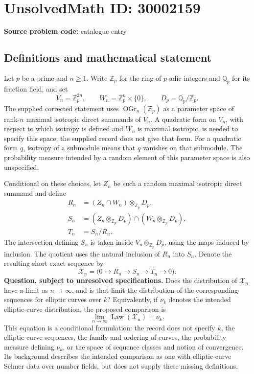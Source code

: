 \documentclass[11pt]{article}
\begin{document}
\section*{UnsolvedMath ID: 30002159}
\textbf{Source problem code:} catalogue entry
\subsection{Definitions and mathematical statement}
Let \(p\) be a prime and \(n\geq 1\). Write \(\mathbb Z_p\) for the ring of \(p\)-adic integers and \(\mathbb Q_p\) for its fraction field, and set
\[
V_n=\mathbb Z_p^{2n},\qquad W_n=\mathbb Z_p^n\times\{0\},\qquad D_p=\mathbb Q_p/\mathbb Z_p.
\]
The supplied corrected statement uses \(\operatorname{OGr}_n(\mathbb Z_p)\) as a parameter space of rank-\(n\) maximal isotropic direct summands of \(V_n\). A quadratic form on \(V_n\), with respect to which isotropy is defined and \(W_n\) is maximal isotropic, is needed to specify this space; the supplied record does not give that form. For a quadratic form \(q\), isotropy of a submodule means that \(q\) vanishes on that submodule. The probability measure intended by a random element of this parameter space is also unspecified.

Conditional on these choices, let \(Z_n\) be such a random maximal isotropic direct summand and define
\[
\begin{aligned}
R_n&=(Z_n\cap W_n)\otimes_{\mathbb Z_p}D_p,\\
S_n&=(Z_n\otimes_{\mathbb Z_p}D_p)\cap
       (W_n\otimes_{\mathbb Z_p}D_p),\\
T_n&=S_n/R_n.
\end{aligned}
\]
The intersection defining \(S_n\) is taken inside \(V_n\otimes_{\mathbb Z_p}D_p\), using the maps induced by inclusion. The quotient uses the natural inclusion of \(R_n\) into \(S_n\). Denote the resulting short exact sequence by
\[
\mathcal X_n=\bigl(0\longrightarrow R_n\longrightarrow S_n
\longrightarrow T_n\longrightarrow 0\bigr).
\]
\textbf{Question, subject to unresolved specifications.} Does the distribution of \(\mathcal X_n\) have a limit as \(n\to\infty\), and is that limit the distribution of the corresponding sequences for elliptic curves over \(k\)? Equivalently, if \(\nu_k\) denotes the intended elliptic-curve distribution, the proposed comparison is
\[
\lim_{n\to\infty}\operatorname{Law}(\mathcal X_n)=\nu_k.
\]
This equation is a conditional formulation: the record does not specify \(k\), the elliptic-curve sequences, the family and ordering of curves, the probability measure defining \(\nu_k\), or the space of sequence classes and notion of convergence. Its background describes the intended comparison as one with elliptic-curve Selmer data over number fields, but does not supply these missing definitions.
\end{document}
